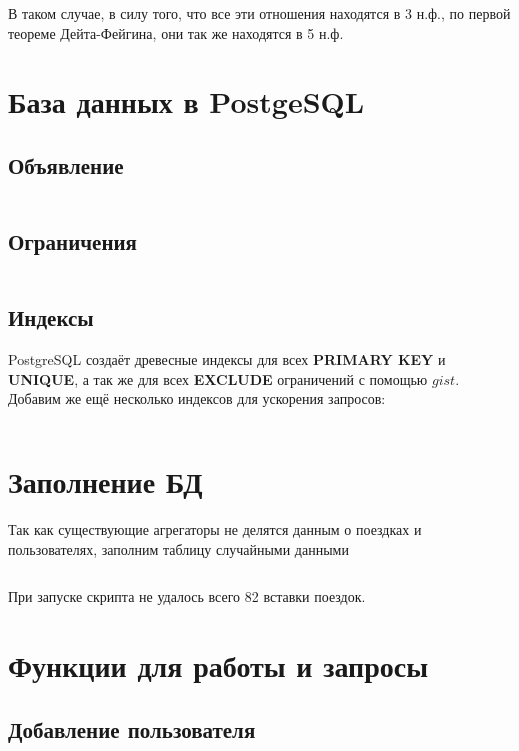 \documentclass[fontsize=12pt]{article}
\begin{document}
В таком случае, в силу того, что все эти отношения находятся в 3 н.ф., по первой теореме Дейта-Фейгина, они так же находятся в 5 н.ф.

\section{База данных в PostgeSQL}

\subsection{Объявление}

\inputminted[frame=single]{sql}{scripts/create-database.sql}

\subsection{Ограничения}

\inputminted[frame=single]{sql}{scripts/add-constraints.sql}

\subsection{Индексы}

PostgreSQL создаёт древесные индексы для всех \textbf{PRIMARY KEY} и \textbf{UNIQUE}, а так же для всех \textbf{EXCLUDE} ограничений с помощью $gist$. Добавим же ещё несколько индексов для ускорения запросов:

\inputminted[frame=single]{sql}{scripts/add-indexes.sql}

\section{Заполнение БД}

Так как существующие агрегаторы не делятся данным о поездках и пользователях, заполним таблицу случайными данными

\inputminted[frame=single, fontsize=\small]{python}{scripts/fill-database.py}
	
При запуске скрипта не удалось всего 82 вставки поездок.	

\section{Функции для работы и запросы}

\subsection*{Добавление пользователя}
\end{document}
